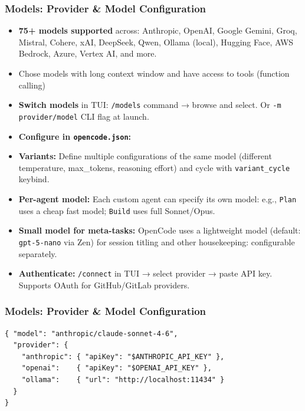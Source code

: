 \begin{frame}[fragile]\frametitle{Models:  Provider \& Model Configuration}
  \begin{itemize}
    \item \textbf{75+ models supported} across: Anthropic, OpenAI, Google Gemini, Groq, Mistral, Cohere, xAI, DeepSeek, Qwen, Ollama (local), Hugging Face, AWS Bedrock, Azure, Vertex AI, and more.
	\item Chose models with long context window and have access to tools (function calling)
    \item \textbf{Switch models} in TUI: \texttt{/models} command → browse and select. Or \texttt{-m provider/model} CLI flag at launch.
    \item \textbf{Configure in \texttt{opencode.json}:}
    \item \textbf{Variants:} Define multiple configurations of the same model (different temperature, max\_tokens, reasoning effort) and cycle with \texttt{variant\_cycle} keybind.
    \item \textbf{Per-agent model:} Each custom agent can specify its own model:  e.g., \texttt{Plan} uses a cheap fast model; \texttt{Build} uses full Sonnet/Opus.
    \item \textbf{Small model for meta-tasks:} OpenCode uses a lightweight model (default: \texttt{gpt-5-nano} via Zen) for session titling and other housekeeping:  configurable separately.
    \item \textbf{Authenticate:} \texttt{/connect} in TUI → select provider → paste API key. Supports OAuth for GitHub/GitLab providers.
  \end{itemize}

\end{frame}

\begin{frame}[fragile]\frametitle{Models:  Provider \& Model Configuration}

\begin{lstlisting}
{ "model": "anthropic/claude-sonnet-4-6",
  "provider": {
    "anthropic": { "apiKey": "$ANTHROPIC_API_KEY" },
    "openai":    { "apiKey": "$OPENAI_API_KEY" },
    "ollama":    { "url": "http://localhost:11434" }
  }
}
\end{lstlisting}  
\end{frame}




